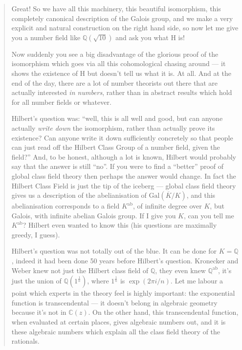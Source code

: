 \documentclass{article}
\begin{document}
\begin{quote}
Great! So we have all this machinery, this beautiful isomorphism, this
completely canonical description of the Galois group, and we make a very
explicit and natural construction on the right hand side, so now let me
give you a number field like \(\mathbb{Q}(\sqrt{10})\) and ask you what
H is!

Now suddenly you see a big disadvantage of the glorious proof of the
isomorphism which goes via all this cohomological chasing around --- it
shows the existence of H but doesn't tell us what it is. At all. And at
the end of the day, there are a lot of number theorists out there that
are actually interested \emph{in numbers}, rather than in abstract
results which hold for all number fields or whatever.

Hilbert's question was: ``well, this is all well and good, but can
anyone actually \emph{write down} the isomorphism, rather than actually
prove its existence? Can anyone write it down sufficiently concretely so
that people can just read off the Hilbert Class Group of a number field,
given the field?'' And, to be honest, although a lot is known, Hilbert
would probably say that the answer is still ``no''. If you were to find
a ``better'' proof of global class field theory then perhaps the answer
would change. In fact the Hilbert Class Field is just the tip of the
iceberg --- global class field theory gives us a description of the
abelianisation of \(\mathrm{Gal}(\overline{K}/K)\), and this
abelianisation corresponds to a field \(K^{\mathrm{ab}}\), of infinite
degree over \(K\), but Galois, with infinite abelian Galois group. If I
give you \(K\), can you tell me \(K^{\mathrm{ab}}\)? Hilbert even wanted
to know this (his questions are maximally greedy, I guess).

Hilbert's question was not totally out of the blue. It can be done for
\(K=\mathbb{Q}\), indeed it had been done 50 years before Hilbert's
question. Kronecker and Weber knew not just the Hilbert class field of
\(\mathbb{Q}\), they even knew \(\mathbb{Q}^{\mathrm{ab}}\), it's just
the union of \(\mathbb{Q}(1^{\frac1n})\), where \(1^{\frac1n}\) is
\(\exp(2\pi i/n)\). Let me labour a point which experts in the theory
feel is highly important: the exponential function is transcendental ---
it doesn't belong in algebraic geometry because it's not in
\(\mathbb{C}(z)\). On the other hand, this transcendental function, when
evaluated at certain places, gives algebraic numbers out, and it is
these algebraic numbers which explain all the class field theory of the
rationals.


\end{quote}
\end{document}
